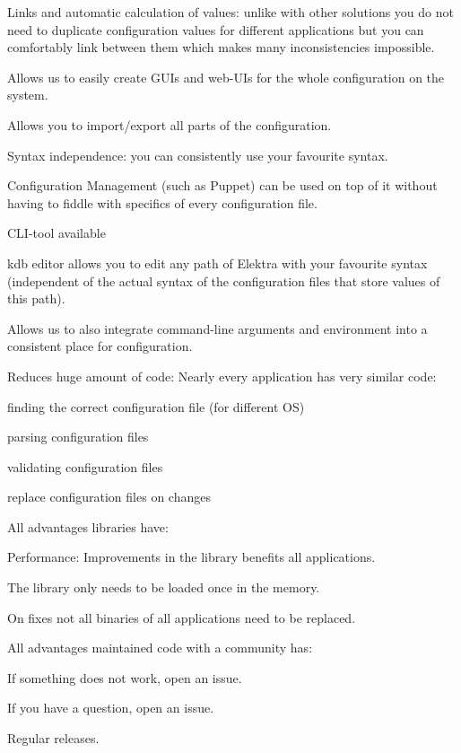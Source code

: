 \begin{DoxyItemize}
\item Links and automatic calculation of values\+: unlike with other solutions you do not need to duplicate configuration values for different applications but you can comfortably link between them which makes many inconsistencies impossible.
\item Allows us to easily create G\+U\+Is and web-\/\+U\+Is for the whole configuration on the system.
\item Allows you to import/export all parts of the configuration.
\item Syntax independence\+: you can consistently use your favourite syntax.
\item Configuration Management (such as Puppet) can be used on top of it without having to fiddle with specifics of every configuration file.
\item C\+L\+I-\/tool available
\item {\ttfamily kdb editor} allows you to edit any path of Elektra with your favourite syntax (independent of the actual syntax of the configuration files that store values of this path).
\item Allows us to also integrate command-\/line arguments and environment into a consistent place for configuration.
\item Reduces huge amount of code\+: Nearly every application has very similar code\+:
\begin{DoxyItemize}
\item finding the correct configuration file (for different OS)
\item parsing configuration files
\item validating configuration files
\item replace configuration files on changes
\end{DoxyItemize}
\item All advantages libraries have\+:
\begin{DoxyItemize}
\item Performance\+: Improvements in the library benefits all applications.
\item The library only needs to be loaded once in the memory.
\item On fixes not all binaries of all applications need to be replaced.
\end{DoxyItemize}
\item All advantages maintained code with a community has\+:
\begin{DoxyItemize}
\item If something does not work, open an issue.
\item If you have a question, open an issue.
\item Regular releases.
\end{DoxyItemize}
\end{DoxyItemize}

